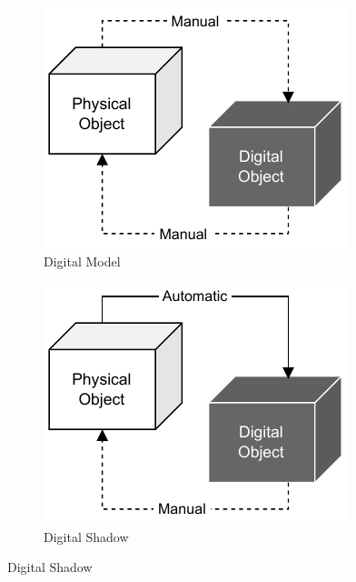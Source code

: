 \begin{figure}[ht]
    \centering
    \begin{subfigure}[b]{0.3\linewidth}
        \centering
        \includegraphics[width=\linewidth]{figures/kritzinger-digital-model.pdf}
        \caption{Digital Model}
        \label{fig:dt-taxonomy-digital-model}
    \end{subfigure}
    \hfill
    \begin{subfigure}[b]{0.3\linewidth}
        \centering
        \includegraphics[width=\linewidth]{figures/kritzinger-digital-shadow.pdf}
        \caption{Digital Shadow}
        \label{fig:dt-taxonomy-digital-shadow}

\end{subfigure}
\end{figure}
